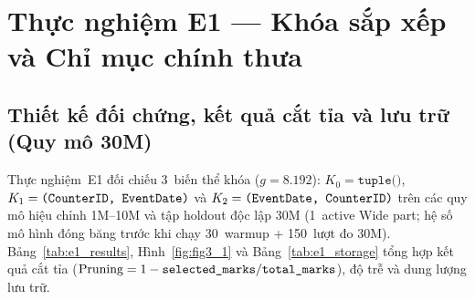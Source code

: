 \documentclass[13pt,a4paper]{report}
\begin{document}
\section{Thực nghiệm E1 --- Khóa sắp xếp và Chỉ mục chính thưa}

\subsection{Thiết kế đối chứng, kết quả cắt tỉa và lưu trữ (Quy mô 30M)}
Thực nghiệm~E1 đối chiếu 3~biến thể khóa ($g = 8.192$): $K_0 = \texttt{tuple()}$, $K_1 = \texttt{(\allowbreak{}CounterID, EventDate)}$ và $K_2 = \texttt{(\allowbreak{}EventDate, CounterID)}$ trên các quy mô hiệu chỉnh 1M--10M và tập holdout độc lập 30M (1~active Wide part; hệ số mô hình đóng băng trước khi chạy 30~warmup + 150~lượt đo 30M). Bảng~\ref{tab:e1_results}, Hình~\ref{fig:fig3_1} và Bảng~\ref{tab:e1_storage} tổng hợp kết quả cắt tỉa ($\text{Pruning} = 1 - \texttt{selected\_\allowbreak{}marks}/\texttt{total\_\allowbreak{}marks}$), độ trễ và dung lượng lưu trữ.
\end{document}

